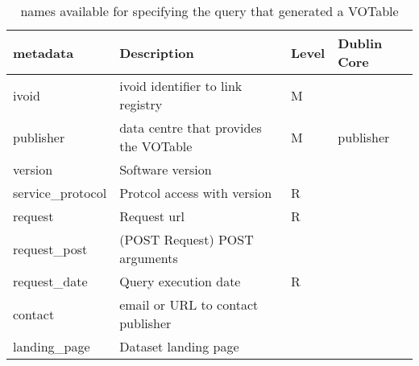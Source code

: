 \documentclass[11pt,a4paper]{ivoa}
\begin{document}
\begin{table}
\begin{tabular}{|l|l|l|l|}  \hline
\textbf{metadata} & \textbf{Description} & \textbf{Level} & \textbf{Dublin Core}\\ \hline
ivoid             & ivoid identifier to link registry & M &  \\ \hline
publisher         & data centre that provides the VOTable & M & publisher\\ \hline
version           & Software version  & & \\ \hline
service\_protocol & Protcol access with version & R& \\ \hline
request           & Request url &  R& \\ \hline
request\_post     & (POST Request) POST arguments &  & \\ \hline
request\_date     & Query execution date & R&\\ \hline	
contact           & email or URL to contact publisher & & \\ \hline	
landing\_page     & Dataset landing page & & \\ \hline
\end{tabular}
\caption{ names available for specifying the query that
generated a VOTable}
\label{tab:query-names}
\end{table}
\end{document}
